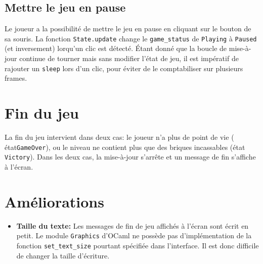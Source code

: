 \documentclass[french]{template}
\begin{document}
\subsection{Mettre le jeu en pause}

Le joueur a la possibilité de mettre le jeu en pause en cliquant sur le bouton de sa souris. La fonction \texttt{State.update} change le \texttt{game\_status} de \texttt{Playing} à \texttt{Paused} (et inversement) lorqu'un clic est détecté. Étant donné que la boucle de mise-à-jour continue de tourner mais sans modifier l'état de jeu, il est impératif de rajouter un \texttt{sleep} lors d'un clic, pour éviter de le comptabiliser sur plusieurs frames.

\section{Fin du jeu}

La fin du jeu intervient dans deux cas: le joueur n'a plus de point de vie ( état\texttt{GameOver}), ou le niveau ne contient plus que des briques incassables (état \texttt{Victory}). Dans les deux cas, la mise-à-jour s'arrête et un message de fin s'affiche à l'écran.

\section{Améliorations}

\begin{itemize}
    \item \textbf{Taille du texte:} Les messages de fin de jeu affichés à l'écran sont écrit en petit. Le module \texttt{Graphics} d'OCaml ne possède pas d'implémentation de la fonction \texttt{set\_text\_size} pourtant spécifiée dans l'interface. Il est donc difficile de changer la taille d'écriture.
\end{itemize}
\end{document}
